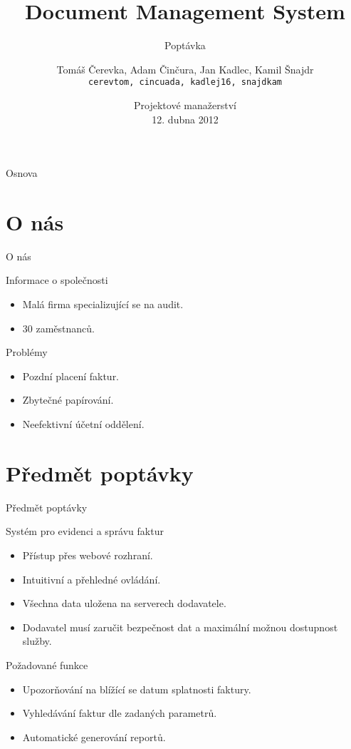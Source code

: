 \documentclass[10pt,hyperref={unicode=true}]{beamer}
\title[Document Management System]{Document Management System}
\subtitle{Poptávka}
\author[Kamil Šnajdr] {
  Tomáš Čerevka, Adam Činčura, Jan Kadlec, Kamil Šnajdr \\
  {\tt cerevtom, cincuada, kadlej16, snajdkam}
}
\institute[ČVUT FIT] {
  Fakulta informačních technologií \\
  České vysoké učení technické \\
  Praha
}
\date[\today]{
Projektové manažerství \\
{\normalsize 12. dubna 2012}
}
\begin{document}
\begin{frame}[plain]
  \titlepage
\end{frame}

\begin{frame}{Osnova}
	\tableofcontents
\end{frame}

\section{O nás}

\begin{frame}{O nás}	
		
  \begin{block}{Informace o společnosti}
    \begin{itemize}
	    \item Malá firma specializující se na audit.
	    \item 30 zaměstnanců.
	  \end{itemize}
	\end{block}
			
	\begin{block}{Problémy}
		\begin{itemize}
			\item Pozdní placení faktur.
			\item Zbytečné papírování.
			\item Neefektivní účetní oddělení.
		\end{itemize}
	\end{block}
\end{frame}

\section{Předmět poptávky}

\begin{frame}{Předmět poptávky}
  \begin{block}{Systém pro evidenci a správu faktur}
		\begin{itemize}
			\item Přístup přes webové rozhraní.
      \item	Intuitivní a přehledné ovládání.
			\item Všechna data uložena na serverech dodavatele.
			\item Dodavatel musí zaručit bezpečnost dat a maximální možnou dostupnost služby.
		\end{itemize}
  \end{block}
	
  \begin{block}{Požadované funkce}
		\begin{itemize}
			\item Upozorňování na blížící se datum splatnosti faktury.
      \item	Vyhledávání faktur dle zadaných parametrů.
			\item Automatické generování reportů.
		\end{itemize}
	\end{block}
\end{frame}
\end{document}
